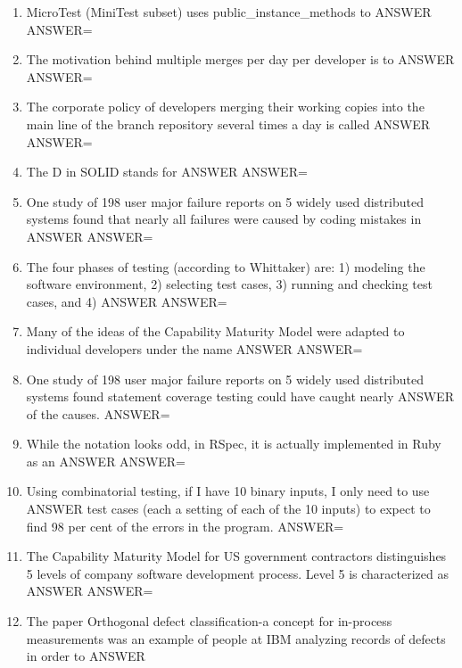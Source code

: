 \documentclass{exam}
\begin{document}
\begin{enumerate}
\item MicroTest (MiniTest subset) uses public\_instance\_methods to ANSWER\newline
ANSWER=
\item The motivation behind multiple merges per day per developer is to ANSWER\newline
ANSWER=
\item The corporate policy of developers merging their working copies into the main line of the branch repository several times a day is called ANSWER\newline
ANSWER=
\item The D in SOLID stands for ANSWER\newline
ANSWER=
\item One study of 198 user major failure reports on 5 widely used distributed systems found that nearly all failures were caused by coding mistakes in ANSWER\newline
ANSWER=
\item The four phases of testing (according to Whittaker) are: 1) modeling the software environment, 2) selecting test cases, 3) running and checking test cases, and 4) ANSWER\newline
ANSWER=
\item Many of the ideas of the Capability Maturity Model were adapted to individual developers under the name ANSWER\newline
ANSWER=
\item One study of 198 user major failure reports on 5 widely used distributed systems found statement coverage testing could have caught nearly ANSWER of the causes.\newline
ANSWER=
\item While the notation looks odd, in RSpec, it is actually implemented in Ruby as an ANSWER\newline
ANSWER=
\item Using combinatorial testing, if I have 10 binary inputs, I only need to use ANSWER test cases (each a setting of each of the 10 inputs) to expect to find 98 per cent of the errors in the program.\newline
ANSWER=
\item The Capability Maturity Model for US government contractors distinguishes 5 levels of company software development process.  Level 5 is characterized as ANSWER\newline
ANSWER=
\item The paper Orthogonal defect classification-a concept for in-process measurements was an example of people at IBM analyzing records of defects in order to ANSWER\newline

\end{enumerate}
\end{document}
